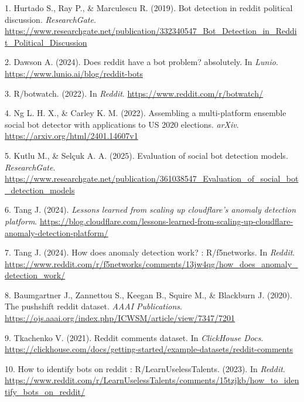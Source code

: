 \documentclass[
  12pt,
  letterpaper,
  DIV=11,
  numbers=noendperiod]{scrartcl}
\newlength{\cslhangindent}
\newenvironment{CSLReferences}[2] %
 {\begin{list}{}{%
  \setlength{\itemindent}{0pt}
  \setlength{\leftmargin}{0pt}
  \setlength{\parsep}{0pt}
  \ifodd #1
   \setlength{\leftmargin}{\cslhangindent}
   \setlength{\itemindent}{-1\cslhangindent}
  \fi
  \setlength{\itemsep}{#2\baselineskip}}}
 {\end{list}}
\begin{document}
\label{refs}
\begin{CSLReferences}{1}{0}
1. Hurtado S., Ray P., \& Marculescu R. (2019). Bot detection in reddit
political discussion. \emph{ResearchGate}.
\url{https://www.researchgate.net/publication/332340547_Bot_Detection_in_Reddit_Political_Discussion}

2. Dawson A. (2024). Does reddit have a bot problem? absolutely. In
\emph{Lunio}. \url{https://www.lunio.ai/blog/reddit-bots}

3. R/botwatch. (2022). In \emph{Reddit}.
\url{https://www.reddit.com/r/botwatch/}

4. Ng L. H. X., \& Carley K. M. (2022). Assembling a multi-platform
ensemble social bot detector with applications to US 2020 elections.
\emph{arXiv}. \url{https://arxiv.org/html/2401.14607v1}

5. Kutlu M., \& Selçuk A. A. (2025). Evaluation of social bot detection
models. \emph{ResearchGate}.
\url{https://www.researchgate.net/publication/361038547_Evaluation_of_social_bot_detection_models}

6. Tang J. (2024). \emph{Lessons learned from scaling up cloudflare's
anomaly detection platform}.
\url{https://blog.cloudflare.com/lessons-learned-from-scaling-up-cloudflare-anomaly-detection-platform/}

7. Tang J. (2024). How does anomaly detection work? : R/f5networks. In
\emph{Reddit}.
\url{https://www.reddit.com/r/f5networks/comments/13jw4qg/how_does_anomaly_detection_work/}

8. Baumgartner J., Zannettou S., Keegan B., Squire M., \& Blackburn J.
(2020). The pushshift reddit dataset. \emph{AAAI Publications}.
\url{https://ojs.aaai.org/index.php/ICWSM/article/view/7347/7201}

9. Tkachenko V. (2021). Reddit comments dataset. In \emph{ClickHouse
Docs}.
\url{https://clickhouse.com/docs/getting-started/example-datasets/reddit-comments}

10. How to identify bots on reddit : R/LearnUselessTalents. (2023). In
\emph{Reddit}.
\url{https://www.reddit.com/r/LearnUselessTalents/comments/15tzjkb/how_to_identify_bots_on_reddit/}


\end{CSLReferences}
\end{document}
